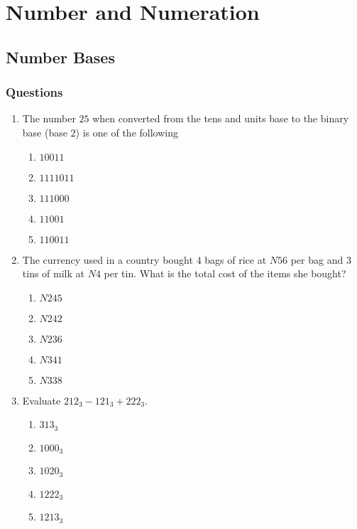 \chapter{Number and Numeration}
\section{Number Bases}
\subsection{Questions}

\begin{multicols}{2}
\begin{enumerate}[label={\arabic*.}]
\item The number \(25\) when converted from the tens and units base to the binary base (base \(2\)) is one of the following
	\begin{enumerate}[label={\Alph*.}]
	\item \(10011\)
	\item \(1111011\)
	\item \(111000\)
	\item \(11001\)
	\item \(110011\)
	\end{enumerate}
 
\item The currency used in a country bought \(4\) bags of rice at \(N56\) per bag and \(3\) tins of milk at \(N4\) per tin. What is the total cost of the items she bought?
  \begin{enumerate}[label={\Alph*.}]
    \item \(N245\)
    \item \(N242\)
    \item \(N236\)
    \item \(N341\)
    \item \(N338\)
  \end{enumerate}

\item Evaluate \(212_{3} - 121_{3} + 222_{3}\).
  \begin{enumerate}[label={\Alph*.}]
    \item \(313_3\)
    \item \(1000_3\)
    \item \(1020_3\)
    \item \(1222_3\)
    \item \(1213_3\)
  \end{enumerate}


\end{enumerate}
\end{multicols}
